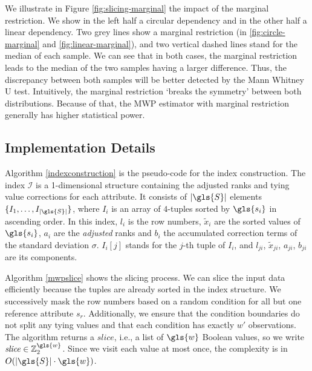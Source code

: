 We illustrate in Figure \ref{fig:slicing-marginal} the impact of the marginal restriction. 
We show in the left half a circular dependency and in the other half a linear dependency. 
Two grey lines show a marginal restriction (in \ref{fig:circle-marginal} and \ref{fig:linear-marginal}), and two vertical dashed lines stand for the median of each sample. 
We can see that in both cases, the marginal restriction leads to the median of the two samples having a larger difference. Thus, the discrepancy between both samples will be better detected by the Mann Whitney U test.
Intuitively, the marginal restriction `breaks the symmetry' between both distributions. 
Because of that, the MWP estimator with marginal restriction generally has higher statistical power.

\subsection{Implementation Details}
Algorithm \ref{indexconstruction} is the pseudo-code for the index construction. The index $\mathcal{I}$ is a 1-dimensional structure containing the adjusted ranks and tying value corrections for each attribute. It consists of $|\gls{S}|$ elements $\{I_1, \dots, I_{|\gls{S}|} \}$, where $I_i$ is an array of $4$-tuples sorted by $\gls{s_i}$ in ascending order.  
In this index, $l_i$ is the row numbers, $\tilde{x}_{i}$ are the sorted values
of $\gls{s_i}$, $a_i$ are the \textit{adjusted} ranks 
and $b_i$ the accumulated correction terms of the standard deviation $\sigma$.
$I_i[j]$ stands for the $j$-th tuple of $I_i$, and $l_{ji}$, $\tilde{x}_{ji}$, $a_{ji}$, $b_{ji}$ are its components.

Algorithm \ref{mwpslice} shows the slicing process. We can slice the input data efficiently because the tuples are already sorted in the index structure. 
We successively mask the row numbers based on a random condition for all but one reference attribute $s_r$. Additionally, we ensure that the condition boundaries do not split any tying values and that each condition has exactly $w'$ observations. 
The algorithm returns a $\mathit{slice}$, i.e., a list of $\gls{w}$ Boolean values, so we write $\mathit{slice} \in \mathbb{Z}_2^{\gls{w}}$. Since we visit each value at most once, the complexity is in  $O(|\gls{S}| \cdot\gls{w})$.

